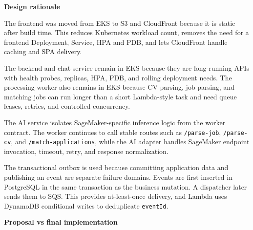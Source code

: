 \vspace{0.5em}\noindent\textbf{Design rationale}\par

The frontend was moved from EKS to S3 and CloudFront because it is
static after build time. This reduces Kubernetes workload count, removes
the need for a frontend Deployment, Service, HPA and PDB, and lets
CloudFront handle caching and SPA delivery.

The backend and chat service remain in EKS because they are long-running
APIs with health probes, replicas, HPA, PDB, and rolling deployment
needs. The processing worker also remains in EKS because CV parsing, job
parsing, and matching jobs can run longer than a short Lambda-style task
and need queue leases, retries, and controlled concurrency.

The AI service isolates SageMaker-specific inference logic from the
worker contract. The worker continues to call stable routes such as
\texttt{/\allowbreak{}parse-\allowbreak{}job}, \texttt{/\allowbreak{}parse-\allowbreak{}cv}, and
\texttt{/\allowbreak{}match-\allowbreak{}applications}, while the AI adapter handles SageMaker
endpoint invocation, timeout, retry, and response normalization.

The transactional outbox is used because committing application data and
publishing an event are separate failure domains. Events are first
inserted in PostgreSQL in the same transaction as the business mutation.
A dispatcher later sends them to SQS. This provides at-least-once
delivery, and Lambda uses DynamoDB conditional writes to deduplicate
\texttt{eventId}.

\vspace{0.5em}\noindent\textbf{Proposal vs final
implementation}\par

